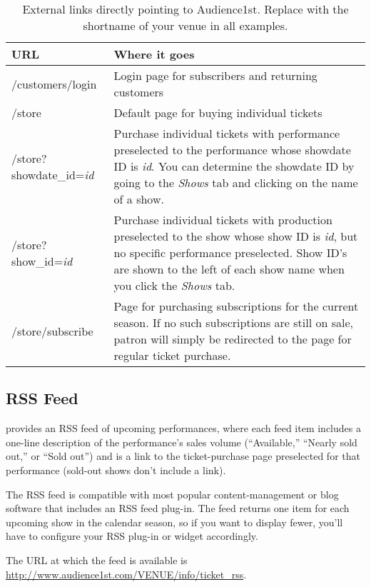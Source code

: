 \begin{table}
  \begin{tabular}{|l|p{}}
    \hline
    \textbf{URL} & \textbf{Where it goes} \\
    \hline
    /customers/login  & Login page for subscribers and returning
    customers \\
    /store & Default page for buying individual tickets \\
    /store?showdate\_id=\emph{id} & Purchase individual tickets with
    performance preselected to the performance whose showdate ID is \emph{id}.
    You can determine the showdate ID by going to the \emph{Shows} tab
    and clicking on the name of a show. \\
    /store?show\_id=\emph{id} & Purchase individual tickets with
    production preselected to the show whose show ID is \emph{id}, but
    no specific performance preselected.  Show
    ID's are shown to the left of each show name when you click the
    \emph{Shows} tab. \\
    /store/subscribe & Page for purchasing subscriptions for the current
    season.  If no such subscriptions are still on sale, patron will
    simply be redirected to the page for regular ticket purchase. \\
  \end{tabular}
\label{table:links}
\caption{External links directly pointing to Audience1st.  Replace
   with the shortname of your venue in all examples.}
\end{table}

\subsection{RSS Feed}
\label{sec:rss}

\af provides an RSS feed of upcoming performances, where each feed item
includes a one-line description of the performance's sales volume
(``Available,'' ``Nearly sold out,'' or ``Sold out'') and is a link to
the ticket-purchase page preselected for that performance (sold-out
shows don't include a link).

The RSS feed is compatible with most popular content-management or blog
software that includes an RSS feed plug-in.  The feed returns one item
for each upcoming show in the calendar season, so if you want to display
fewer, you'll have to configure your RSS plug-in or widget accordingly.

The URL at which the feed is available is
\url{http://www.audience1st.com/VENUE/info/ticket_rss}.

